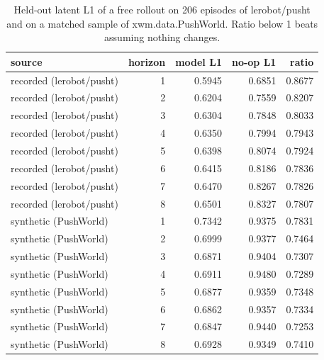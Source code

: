 \begin{table}[t]
\centering
\begin{tabular}{lrrrr}
\toprule
source & horizon & model L1 & no-op L1 & ratio \\
\midrule
recorded (lerobot/pusht) & 1 & 0.5945 & 0.6851 & 0.8677 \\
recorded (lerobot/pusht) & 2 & 0.6204 & 0.7559 & 0.8207 \\
recorded (lerobot/pusht) & 3 & 0.6304 & 0.7848 & 0.8033 \\
recorded (lerobot/pusht) & 4 & 0.6350 & 0.7994 & 0.7943 \\
recorded (lerobot/pusht) & 5 & 0.6398 & 0.8074 & 0.7924 \\
recorded (lerobot/pusht) & 6 & 0.6415 & 0.8186 & 0.7836 \\
recorded (lerobot/pusht) & 7 & 0.6470 & 0.8267 & 0.7826 \\
recorded (lerobot/pusht) & 8 & 0.6501 & 0.8327 & 0.7807 \\
synthetic (PushWorld) & 1 & 0.7342 & 0.9375 & 0.7831 \\
synthetic (PushWorld) & 2 & 0.6999 & 0.9377 & 0.7464 \\
synthetic (PushWorld) & 3 & 0.6871 & 0.9404 & 0.7307 \\
synthetic (PushWorld) & 4 & 0.6911 & 0.9480 & 0.7289 \\
synthetic (PushWorld) & 5 & 0.6877 & 0.9359 & 0.7348 \\
synthetic (PushWorld) & 6 & 0.6862 & 0.9357 & 0.7334 \\
synthetic (PushWorld) & 7 & 0.6847 & 0.9440 & 0.7253 \\
synthetic (PushWorld) & 8 & 0.6928 & 0.9349 & 0.7410 \\
\bottomrule
\end{tabular}
\caption{Held-out latent L1 of a free rollout on 206 episodes of lerobot/pusht and on a matched sample of xwm.data.PushWorld. Ratio below 1 beats assuming nothing changes.}
\label{tab:recorded}
\end{table}
